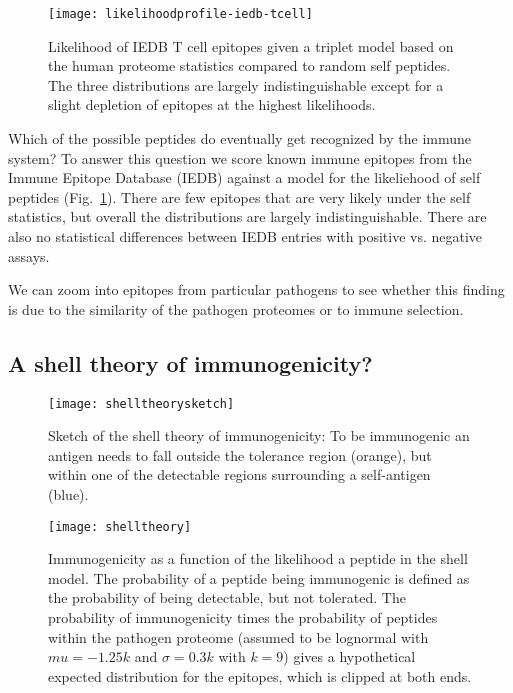 \documentclass[superscriptaddress,twocolumn,pre]{revtex4}
\newcommand{\<}{\langle}
\renewcommand{\>}{\rangle}
\begin{document}
\begin{figure}
    \texttt{[image: likelihoodprofile-iedb-tcell]}
    \caption{Likelihood of IEDB T cell epitopes given a triplet model based on the human proteome statistics compared to random self peptides. The three distributions are largely indistinguishable except for a slight depletion of epitopes at the highest likelihoods.
    \label{figtcelliedb}
    }
\end{figure}

Which of the possible peptides do eventually get recognized by the immune system? To answer this question we score known immune epitopes from the Immune Epitope Database (IEDB) against a model for the likeliehood of self peptides (Fig.~\ref{figtcelliedb}). There are few epitopes that are very likely under the self statistics, but overall the distributions are largely indistinguishable. There are also no statistical differences between IEDB entries with positive vs. negative assays.

We can zoom into epitopes from particular pathogens to see whether this finding is due to the similarity of the pathogen proteomes or to immune selection.



\subsection{A shell theory of immunogenicity?}

\begin{figure}
    \texttt{[image: shelltheorysketch]}
    \caption{Sketch of the shell theory of immunogenicity: To be immunogenic an antigen needs to fall outside the tolerance region (orange), but within one of the detectable regions surrounding a self-antigen (blue).
    \label{figshelltheorysketch}
    }
\end{figure}

\begin{figure}
    \texttt{[image: shelltheory]}
    \caption{Immunogenicity as a function of the likelihood a peptide in the shell model. The probability of a peptide being immunogenic is defined as the probability of being detectable, but not tolerated. The probability of immunogenicity times the probability of peptides within the pathogen proteome (assumed to be lognormal with $mu = -1.25 k$ and $\sigma = 0.3 k$ with $k=9$) gives a hypothetical expected distribution for the epitopes, which is clipped at both ends.  
    \label{figshelltheory}
    }
\end{figure}
\end{document}
